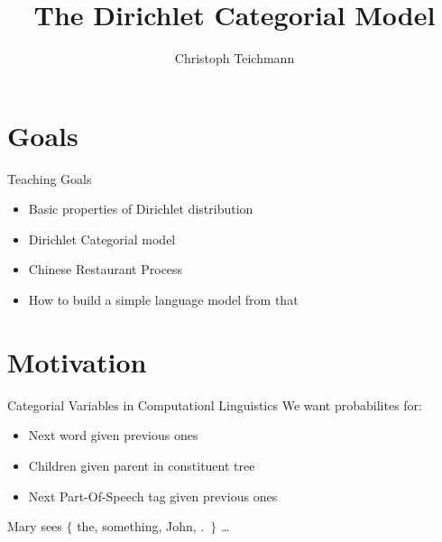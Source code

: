 \documentclass[11pt]{beamer}
\author{Christoph Teichmann}
\title{The Dirichlet Categorial Model}
\subtitle{}
\institute{}
\date{}
\begin{document}
	
	\begin{frame}
		\maketitle
	\end{frame}
	
	\section{Goals}
	
	\begin{frame}{Teaching Goals}
		\begin{itemize}
			\item Basic properties of Dirichlet distribution
			\item Dirichlet Categorial model
			\item Chinese Restaurant Process
			\item How to build a simple language model from that
		\end{itemize}
	\end{frame}
	
	\section{Motivation}
	
	\begin{frame}{Categorial Variables in Computationl Linguistics}
		\centering
		We want probabilites for:
				
		\begin{itemize}
			\item Next word given previous ones
			\item Children given parent in constituent tree
			\item Next Part-Of-Speech tag given previous ones
		\end{itemize}
		
		\vspace{20pt} Mary sees $\lbrace$ the, something, John, .\ $\rbrace$ \dots
	\end{frame}
	
\end{document}
